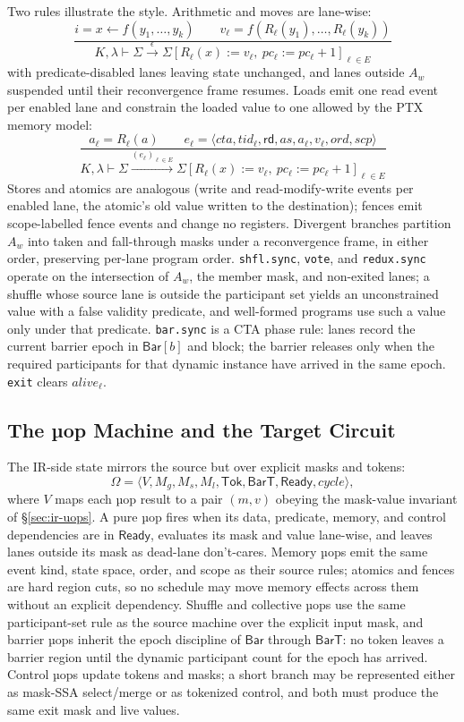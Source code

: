 \documentclass[sigplan,nonacm]{acmart}
\begin{document}
Two rules illustrate the style.  Arithmetic and moves are lane-wise:
\[
\frac{
  i = x \leftarrow f(y_1,\ldots,y_k)
  \qquad
  v_\ell = f(R_\ell(y_1),\ldots,R_\ell(y_k))
}{
  K,\lambda \vdash \Sigma
  \xrightarrow{\epsilon}
  \Sigma[
    R_\ell(x) := v_\ell,\ pc_\ell := pc_\ell+1
  ]_{\ell\in E}
}
\]
with predicate-disabled lanes leaving state unchanged, and lanes outside
$A_w$ suspended until their reconvergence frame resumes.  Loads emit one
read event per enabled lane and constrain the loaded value to one allowed by
the PTX memory model:
\[
\frac{
  a_\ell = R_\ell(a)
  \qquad
  e_\ell=\langle cta,tid_\ell,\mathsf{rd},as,a_\ell,v_\ell,ord,scp\rangle
}{
  K,\lambda \vdash \Sigma
  \xrightarrow{(e_\ell)_{\ell\in E}}
  \Sigma[R_\ell(x):=v_\ell,\ pc_\ell:=pc_\ell+1]_{\ell\in E}
}
\]
Stores and atomics are analogous (write and read-modify-write events per
enabled lane, the atomic's old value written to the destination); fences
emit scope-labelled fence events and change no registers.  Divergent
branches partition $A_w$ into taken and fall-through masks under a
reconvergence frame, in either order, preserving per-lane program order.
\texttt{shfl.sync}, \texttt{vote}, and \texttt{redux.sync} operate on the
intersection of $A_w$, the member mask, and non-exited lanes; a shuffle
whose source lane is outside the participant set yields an unconstrained
value with a false validity predicate, and well-formed programs use such a
value only under that predicate.  \texttt{bar.sync} is a CTA phase rule:
lanes record the current barrier epoch in $\mathsf{Bar}[b]$ and block; the
barrier releases only when the required participants for that dynamic
instance have arrived in the same epoch.  \texttt{exit} clears
$alive_\ell$.

\subsection{The µop Machine and the Target Circuit}
\label{sec:uop-sem}

The IR-side state mirrors the source but over explicit masks and tokens:
\[
  \Omega =
  \langle
    V, M_g, M_s, M_l, \mathsf{Tok}, \mathsf{BarT},
    \mathsf{Ready}, cycle
  \rangle ,
\]
where $V$ maps each µop result to a pair $(m,v)$ obeying the mask-value
invariant of \S\ref{sec:ir-uops}.  A pure µop fires when its data,
predicate, memory, and control dependencies are in $\mathsf{Ready}$,
evaluates its mask and value lane-wise, and leaves lanes outside its mask as
dead-lane don't-cares.  Memory µops emit the same event kind, state space,
order, and scope as their source rules; atomics and fences are hard region
cuts, so no schedule may move memory effects across them without an explicit
dependency.  Shuffle and collective µops use the same participant-set rule
as the source machine over the explicit input mask, and barrier µops inherit
the epoch discipline of $\mathsf{Bar}$ through $\mathsf{BarT}$: no token
leaves a barrier region until the dynamic participant count for the epoch
has arrived.  Control µops update tokens and masks; a short branch may be
represented either as mask-SSA select/merge or as tokenized control, and
both must produce the same exit mask and live values.
\end{document}
